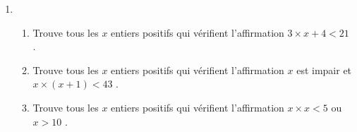 \documentclass[class=report,crop=false, 12pt]{standalone}
\begin{document}
\begin{activite}
\begin{enumerate}
  \item

  \begin{enumerate}
    \item Trouve tous les $x$ entiers positifs qui vérifient l'affirmation \og $3 \times x + 4 < 21$ \fg{}.
    \item Trouve tous les $x$ entiers positifs qui vérifient  l'affirmation \og $x$ est impair et ${x\times(x+1) < 43}$ \fg{}.
    \item Trouve tous les $x$ entiers positifs qui vérifient l'affirmation \og $x \times x < 5$ ou $x >10$ \fg{}.
  \end{enumerate} 
   
\end{enumerate}


\end{activite}
\end{document}
